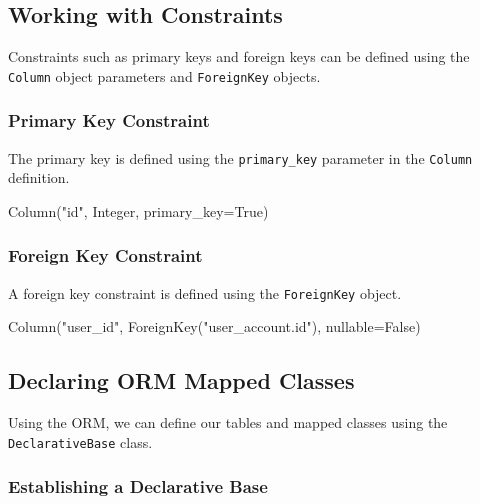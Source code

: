 \documentclass[
  letterpaper,
  DIV=11,
  numbers=noendperiod]{scrreprt}
\newenvironment{Shaded}{\begin{snugshade}}{\end{snugshade}}
\newcommand{\NormalTok}[1]{\textcolor[rgb]{0.00,0.23,0.31}{#1}}
\newcommand{\OperatorTok}[1]{\textcolor[rgb]{0.37,0.37,0.37}{#1}}
\newcommand{\StringTok}[1]{\textcolor[rgb]{0.13,0.47,0.30}{#1}}
\newcommand{\VariableTok}[1]{\textcolor[rgb]{0.07,0.07,0.07}{#1}}
\begin{document}
\subsection{Working with Constraints}\label{working-with-constraints}

Constraints such as primary keys and foreign keys can be defined using
the \texttt{Column} object parameters and \texttt{ForeignKey} objects.

\subsubsection{Primary Key Constraint}\label{primary-key-constraint}

The primary key is defined using the \texttt{primary\_key} parameter in
the \texttt{Column} definition.

\begin{Shaded}
\begin{Highlighting}[]
\NormalTok{Column(}\StringTok{"id"}\NormalTok{, Integer, primary\_key}\OperatorTok{=}\VariableTok{True}\NormalTok{)}
\end{Highlighting}
\end{Shaded}

\subsubsection{Foreign Key Constraint}\label{foreign-key-constraint}

A foreign key constraint is defined using the \texttt{ForeignKey}
object.

\begin{Shaded}
\begin{Highlighting}[]
\NormalTok{Column(}\StringTok{"user\_id"}\NormalTok{, ForeignKey(}\StringTok{"user\_account.id"}\NormalTok{), nullable}\OperatorTok{=}\VariableTok{False}\NormalTok{)}
\end{Highlighting}
\end{Shaded}

\subsection{Declaring ORM Mapped
Classes}\label{declaring-orm-mapped-classes}

Using the ORM, we can define our tables and mapped classes using the
\texttt{DeclarativeBase} class.

\subsubsection{Establishing a Declarative
Base}\label{establishing-a-declarative-base}
\end{document}
